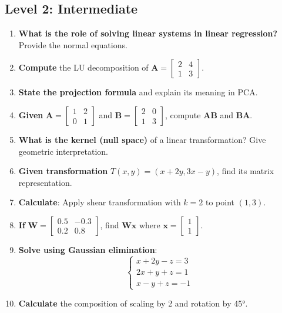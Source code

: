 \documentclass[12pt,a4paper]{article}
\theoremstyle{definition}
\begin{document}
\subsection{Level 2: Intermediate}

\begin{enumerate}[resume]
\item \textbf{What is the role of solving linear systems in linear regression?} Provide the normal equations.

\item \textbf{Compute} the LU decomposition of $\mathbf{A} = \begin{bmatrix} 2 & 4 \\ 1 & 3 \end{bmatrix}$.

\item \textbf{State the projection formula} and explain its meaning in PCA.

\item \textbf{Given} $\mathbf{A} = \begin{bmatrix} 1 & 2 \\ 0 & 1 \end{bmatrix}$ and $\mathbf{B} = \begin{bmatrix} 2 & 0 \\ 1 & 3 \end{bmatrix}$, compute $\mathbf{AB}$ and $\mathbf{BA}$.

\item \textbf{What is the kernel (null space)} of a linear transformation? Give geometric interpretation.

\item \textbf{Given transformation} $T(x, y) = (x + 2y, 3x - y)$, find its matrix representation.

\item \textbf{Calculate}: Apply shear transformation with $k=2$ to point $(1, 3)$.

\item \textbf{If} $\mathbf{W} = \begin{bmatrix} 0.5 & -0.3 \\ 0.2 & 0.8 \end{bmatrix}$, find $\mathbf{Wx}$ where $\mathbf{x} = \begin{bmatrix} 1 \\ 1 \end{bmatrix}$.

\item \textbf{Solve using Gaussian elimination}:
\[
\begin{cases}
x + 2y - z = 3 \\
2x + y + z = 1 \\
x - y + z = -1
\end{cases}
\]

\item \textbf{Calculate} the composition of scaling by 2 and rotation by 45°.
\end{enumerate}
\end{document}
